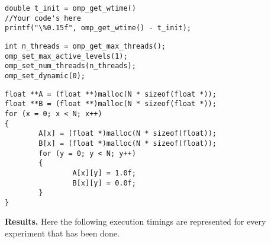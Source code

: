 \documentclass[conference]{IEEEtran}
\newcommand{\mypar}[1]{{\bf #1.}}
\begin{document}
\renewcommand{\lstlistingname}{Algorithm}

\begin{lstlisting}[caption={An example of code for obtaining the execution timing},label={lst:omp-get-time-alg}]
double t_init = omp_get_wtime()
//Your code's here
printf("\%0.15f", omp_get_wtime() - t_init);
\end{lstlisting}

\begin{lstlisting}[caption={OpenMP Configs},label={lst:omp-configs-alg}]
int n_threads = omp_get_max_threads();
omp_set_max_active_levels(1);
omp_set_num_threads(n_threads);
omp_set_dynamic(0);
\end{lstlisting}

\begin{lstlisting}[caption={A and B matrices initialization},label={lst:initialization-alg}]
float **A = (float **)malloc(N * sizeof(float *));
float **B = (float **)malloc(N * sizeof(float *));
for (x = 0; x < N; x++)
{
		A[x] = (float *)malloc(N * sizeof(float));
		B[x] = (float *)malloc(N * sizeof(float));
		for (y = 0; y < N; y++)
		{
				A[x][y] = 1.0f;
				B[x][y] = 0.0f;
		}
}
\end{lstlisting}

\mypar{Results}
Here the following execution timings are represented for every experiment that has been done.
\end{document}
